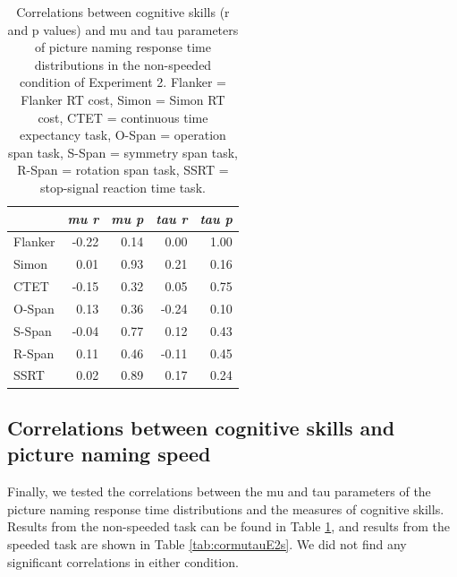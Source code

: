\documentclass[
  man,floatsintext]{apa6}
\begin{document}
\begin{table}

\caption{\label{tab:cormutauE2}Correlations between cognitive skills (r and p values) and mu and tau parameters of picture naming response time distributions in the non-speeded condition of Experiment 2. Flanker = Flanker RT cost, Simon = Simon RT cost, CTET = continuous time expectancy task, O-Span = operation span task, S-Span = symmetry span task, R-Span = rotation span task, SSRT = stop-signal reaction time task.}
\centering
\begin{tabular}[t]{lrrrr}
\toprule
\em{ } & \em{mu r} & \em{mu p} & \em{tau r} & \em{tau p}\\
\midrule
Flanker & -0.22 & 0.14 & 0.00 & 1.00\\
Simon & 0.01 & 0.93 & 0.21 & 0.16\\
CTET & -0.15 & 0.32 & 0.05 & 0.75\\
O-Span & 0.13 & 0.36 & -0.24 & 0.10\\
S-Span & -0.04 & 0.77 & 0.12 & 0.43\\
\addlinespace
R-Span & 0.11 & 0.46 & -0.11 & 0.45\\
SSRT & 0.02 & 0.89 & 0.17 & 0.24\\
\bottomrule
\end{tabular}
\end{table}

\hypertarget{correlations-between-cognitive-skills-and-picture-naming-speed-1}{%
\subsection{Correlations between cognitive skills and picture naming speed}\label{correlations-between-cognitive-skills-and-picture-naming-speed-1}}

Finally, we tested the correlations between the mu and tau parameters of the picture naming response time distributions and the measures of cognitive skills. Results from the non-speeded task can be found in Table \ref{tab:cormutauE2}, and results from the speeded task are shown in Table \ref{tab:cormutauE2s}. We did not find any significant correlations in either condition.
\end{document}
